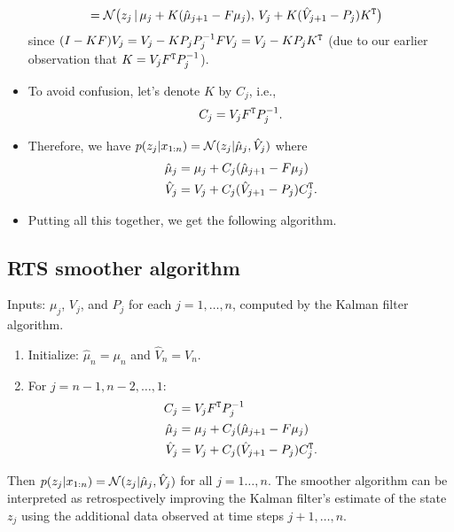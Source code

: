 \documentclass[12pt]{article}
\begin{document}
\begin{itemize}
\begin{align*}
& = \mathcal{N} \big(z_j \,\vert\,\mu_j + K(\hat \mu_{j+1}- F \mu_j),\, V_j + K(\hat V_{j+1} - P_j) K^{\mathtt{T}} \big)
\end{align*}
since $(I - K F) V_j = V_j - K P_j P_j^{-1} F V_j = V_j - K P_j K^{\mathtt{T}}$ (due to our earlier observation that $K = V_j F^{\mathtt{T}} P_j^{-1}$).
\item To avoid confusion, let's denote $K$ by $C_j$, i.e., 
$$ C_j = V_j F^{\mathtt{T}} P_j^{-1}. $$
\item Therefore, we have $p(z_j | x_{1:n}) = \mathcal{N}(z_j | \hat \mu_j,\hat V_j)$ where
\begin{align*}
\hat \mu_j & = \mu_j + C_j(\hat \mu_{j+1} - F \mu_j)\\
\hat V_j & = V_j + C_j(\hat V_{j+1} - P_j) C_j^{\mathtt{T}}.
\end{align*}
\item Putting all this together, we get the following algorithm.
\end{itemize}

\subsection*{RTS smoother algorithm}
Inputs: $\mu_j$, $V_j$, and $P_j$ for each $j = 1,\ldots,n$, computed by the Kalman filter algorithm.
\begin{enumerate}
\item Initialize: $\hat \mu_n = \mu_n$ and $\hat V_n = V_n$.
\item For $j = n-1,n-2,\ldots,1$:
\begin{align*}
C_j & = V_j F^{\mathtt{T}} P_j^{-1}\\
\hat \mu_j & = \mu_j + C_j(\hat \mu_{j+1} - F \mu_j)\\
\hat V_j & = V_j + C_j(\hat V_{j+1} - P_j) C_j^{\mathtt{T}}.
\end{align*}
\end{enumerate}
Then $p(z_j | x_{1:n}) = \mathcal{N}(z_j | \hat \mu_j,\hat V_j)$ for all $j = 1 \ldots,n$. The smoother algorithm can be interpreted as retrospectively improving the Kalman filter's estimate of the state $z_j$ using the additional data observed at time steps $j+1,\ldots,n$.
\end{document}
